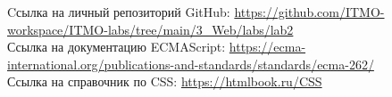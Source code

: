 \begin{thebibliography}{}
     Cсылка на личный репозиторий GitHub: \url{https://github.com/ITMO-workspace/ITMO-labs/tree/main/3_Web/labs/lab2}\\
     Ссылка на документацию ECMAScript: \url{https://ecma-international.org/publications-and-standards/standards/ecma-262/}\\
     Ссылка на справочник по CSS: \url{https://htmlbook.ru/CSS}\\
\end{thebibliography}